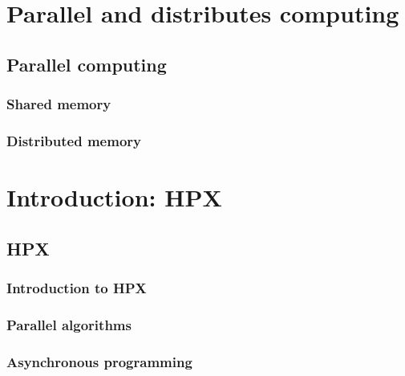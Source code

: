 \documentclass[11pt,fleqn]{book} %
\begin{document}
\part{Parallel and distributes computing}

\chapter{Parallel computing}

\section{Shared memory}

\section{Distributed memory}

\part{Introduction: HPX}

\chapter{HPX}

\section{Introduction to HPX}

\section{Parallel algorithms}

\section{Asynchronous programming}

\end{document}
